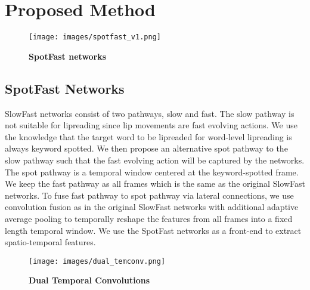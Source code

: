 \documentclass{article}
\begin{document}
 \section{Proposed Method}

\begin{figure}[t] 
\vspace{-0.5\baselineskip}
\begin{center}
   \texttt{[image: images/spotfast\_v1.png]}
\end{center}
\vspace{-1.5\baselineskip}
   \caption{\textbf{SpotFast networks}}
   \label{sys_overview}
\label{fig:long}
\label{fig:onecol}
\vspace{-1\baselineskip}
\end{figure}

\subsection{SpotFast Networks}
SlowFast networks \cite{feichtenhofer2019slowfast} consist of two pathways, slow and fast. The slow pathway is not suitable for lipreading since lip movements are fast evolving actions. We use the knowledge that the target word to be lipreaded for word-level lipreading is always keyword spotted. We then propose an alternative spot pathway to the slow pathway such that the fast evolving action will be captured by the networks. The spot pathway is a temporal window centered at the keyword-spotted frame. We keep the fast pathway as all frames which is the same as the original SlowFast networks. To fuse fast pathway to spot pathway via lateral connections, we use convolution fusion as in the original SlowFast networks with additional adaptive average pooling to temporally reshape the features from all frames into a fixed length temporal window. We use the SpotFast networks as a front-end to extract spatio-temporal features.

\begin{figure}[t] 
\vspace{0.5\baselineskip}
\begin{center}
   \texttt{[image: images/dual\_temconv.png]}
\end{center}
\vspace{-1.5\baselineskip}
   \caption{\textbf{Dual Temporal Convolutions}}
   \label{sys_overview}
\label{fig:long}
\label{fig:onecol}
\vspace{-1\baselineskip}
\end{figure}
\end{document}
